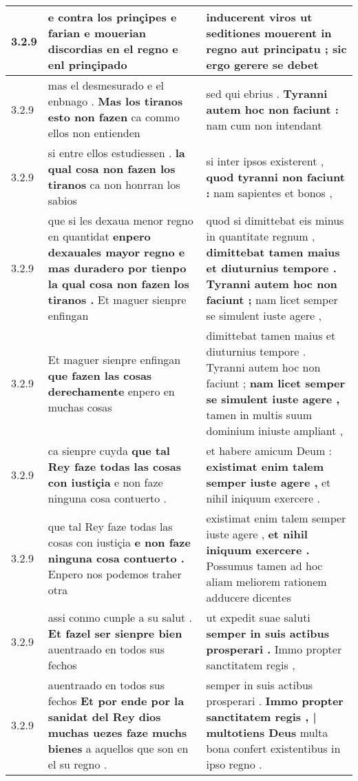 \begin{tabular}{|p{1cm}|p{6.5cm}|p{6.5cm}|}
3.2.9 & e contra los prinçipes \textbf{ e farian e mouerian discordias en el regno } e enl prinçipado & inducerent viros \textbf{ ut seditiones mouerent in regno aut principatu ; } sic ergo gerere se debet \\\hline
3.2.9 & mas el desmesurado e el enbnago . \textbf{ Mas los tiranos esto non fazen } ca commo ellos non entienden & sed qui ebrius . \textbf{ Tyranni autem hoc non faciunt : } nam cum non intendant \\\hline
3.2.9 & si entre ellos estudiessen . \textbf{ la qual cosa non fazen los tiranos } ca non honrran los sabios & si inter ipsos existerent , \textbf{ quod tyranni non faciunt : } nam sapientes et bonos , \\\hline
3.2.9 & que si les dexaua menor regno en quantidat \textbf{ enpero dexauales mayor regno e mas duradero por tienpo la qual cosa non fazen los tiranos . } Et maguer sienpre enfingan & quod si dimittebat eis minus in quantitate regnum , \textbf{ dimittebat tamen maius et diuturnius tempore . Tyranni autem hoc non faciunt ; } nam licet semper se simulent iuste agere , \\\hline
3.2.9 & Et maguer sienpre enfingan \textbf{ que fazen las cosas derechamente } enpero en muchas cosas & dimittebat tamen maius et diuturnius tempore . Tyranni autem hoc non faciunt ; \textbf{ nam licet semper se simulent iuste agere , } tamen in multis suum dominium iniuste ampliant , \\\hline
3.2.9 & ca sienpre cuyda \textbf{ que tal Rey faze todas las cosas con iustiçia } e non faze ninguna cosa contuerto . & et habere amicum Deum : \textbf{ existimat enim talem semper iuste agere , } et nihil iniquum exercere . \\\hline
3.2.9 & que tal Rey faze todas las cosas con iustiçia \textbf{ e non faze ninguna cosa contuerto . } Enpero nos podemos traher otra & existimat enim talem semper iuste agere , \textbf{ et nihil iniquum exercere . } Possumus tamen ad hoc aliam meliorem rationem adducere dicentes \\\hline
3.2.9 & assi conmo cunple a su salut . \textbf{ Et fazel ser sienpre bien } auentraado en todos sus fechos & ut expedit suae saluti \textbf{ semper in suis actibus prosperari . } Immo propter sanctitatem regis , \\\hline
3.2.9 & auentraado en todos sus fechos \textbf{ Et por ende por la sanidat del Rey dios muchas uezes faze muchs bienes } a aquellos que son en el su regno . & semper in suis actibus prosperari . \textbf{ Immo propter sanctitatem regis , | multotiens Deus } multa bona confert existentibus in ipso regno . \\\hline

\end{tabular}
